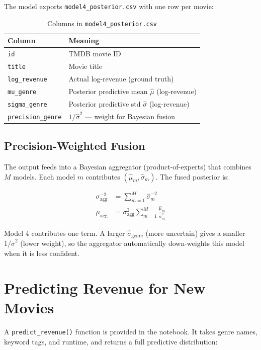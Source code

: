 \documentclass[12pt,a4paper]{article}
\begin{document}
The model exports \texttt{model4\_posterior.csv} with one row per movie:

\begin{table}[H]
\centering
\begin{tabular}{ll}
\toprule
\textbf{Column} & \textbf{Meaning} \\
\midrule
\texttt{id}               & TMDB movie ID \\
\texttt{title}            & Movie title \\
\texttt{log\_revenue}     & Actual log-revenue (ground truth) \\
\texttt{mu\_genre}        & Posterior predictive mean $\hat{\mu}$ (log-revenue) \\
\texttt{sigma\_genre}     & Posterior predictive std $\hat{\sigma}$ (log-revenue) \\
\texttt{precision\_genre} & $1/\hat{\sigma}^2$ — weight for Bayesian fusion \\
\bottomrule
\end{tabular}
\caption{Columns in \texttt{model4\_posterior.csv}}
\end{table}

\subsection{Precision-Weighted Fusion}

The output feeds into a Bayesian aggregator (product-of-experts) that
combines $M$ models. Each model $m$ contributes $(\hat{\mu}_m, \hat{\sigma}_m)$.
The fused posterior is:

\begin{align}
  \sigma_\text{agg}^{-2} &= \sum_{m=1}^{M} \hat{\sigma}_m^{-2} \\[6pt]
  \mu_\text{agg} &= \sigma_\text{agg}^2 \sum_{m=1}^{M}
    \frac{\hat{\mu}_m}{\hat{\sigma}_m^2}
\end{align}

Model 4 contributes one term. A larger $\hat{\sigma}_\text{genre}$
(more uncertain) gives a smaller $1/\hat{\sigma}^2$ (lower weight),
so the aggregator automatically down-weights this model when it is
less confident.

\section{Predicting Revenue for New Movies}

A \texttt{predict\_revenue()} function is provided in the notebook.
It takes genre names, keyword tags, and runtime, and returns a
full predictive distribution:
\end{document}
